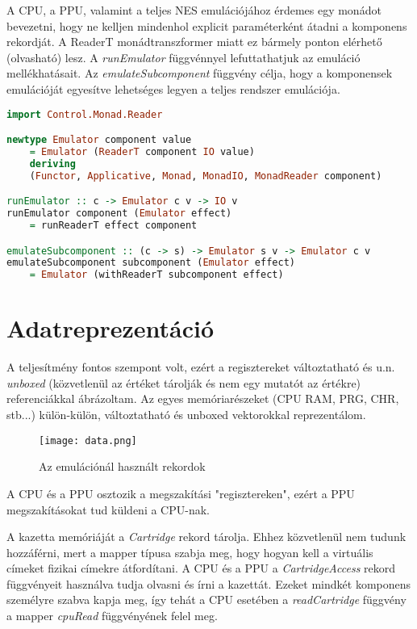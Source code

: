 A CPU, a PPU, valamint a teljes NES emulációjához érdemes egy monádot bevezetni, hogy ne kelljen mindenhol explicit paraméterként átadni a komponens rekordját. A ReaderT monádtranszformer miatt ez bármely ponton elérhető (olvasható) lesz. A \emph{runEmulator} függvénnyel lefuttathatjuk az emuláció mellékhatásait. Az \emph{emulateSubcomponent} függvény célja, hogy a komponensek emulációját egyesítve lehetséges legyen a teljes rendszer emulációja.
\vspace{0.2cm}
\begin{lstlisting}[language=Haskell, basicstyle=\scriptsize]
import Control.Monad.Reader

newtype Emulator component value 
	= Emulator (ReaderT component IO value) 
	deriving 
	(Functor, Applicative, Monad, MonadIO, MonadReader component)

runEmulator :: c -> Emulator c v -> IO v
runEmulator component (Emulator effect) 
	= runReaderT effect component

emulateSubcomponent :: (c -> s) -> Emulator s v -> Emulator c v
emulateSubcomponent subcomponent (Emulator effect) 
	= Emulator (withReaderT subcomponent effect)
\end{lstlisting}

\section{Adatreprezentáció}

A teljesítmény fontos szempont volt, ezért a regisztereket változtatható és u.n. \emph{unboxed} (közvetlenül az értéket tárolják és nem egy mutatót az értékre) referenciákkal ábrázoltam. Az egyes memóriarészeket (CPU RAM, PRG, CHR, stb...) külön-külön, változtatható és unboxed vektorokkal reprezentálom.

\begin{figure}[H]
	\centering
	\texttt{[image: data.png]}
	\caption{Az emulációnál használt rekordok}
\end{figure}

A CPU és a PPU osztozik a megszakítási "regisztereken", ezért a PPU megszakításokat tud küldeni a CPU-nak.

A kazetta memóriáját a \emph{Cartridge} rekord tárolja. Ehhez közvetlenül nem tudunk hozzáférni, mert a mapper típusa szabja meg, hogy hogyan kell a virtuális címeket fizikai címekre átfordítani. A CPU és a PPU a \emph{CartridgeAccess} rekord függvényeit használva tudja olvasni és írni a kazettát. Ezeket mindkét komponens személyre szabva kapja meg, így tehát a CPU esetében a \emph{readCartridge} függvény a mapper \emph{cpuRead} függvényének felel meg.

